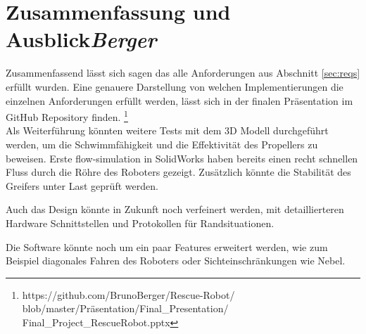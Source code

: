 \section{Zusammenfassung und Ausblick\hfill\textnormal{\emph{Berger}}}
Zusammenfassend lässt sich sagen das alle Anforderungen aus Abschnitt \ref{sec:reqs} erfüllt wurden.
Eine genauere Darstellung von welchen Implementierungen die einzelnen Anforderungen erfüllt werden,
lässt sich in der finalen Präsentation im GitHub Repository finden.
\footnote{https://github.com/BrunoBerger/Rescue-Robot/\linebreak
    blob/master/Präsentation/Final\_Presentation/\linebreak
    Final\_Project\_RescueRobot.pptx}
\\  

Als Weiterführung könnten weitere Tests mit dem 3D Modell durchgeführt werden,
um die Schwimmfähigkeit und die Effektivität des Propellers zu beweisen.
Erste flow-simulation in SolidWorks haben bereits einen recht schnellen Fluss
durch die Röhre des Roboters gezeigt.
Zusätzlich könnte die Stabilität des Greifers unter Last geprüft werden.

Auch das Design könnte in Zukunft noch verfeinert werden,
mit detaillierteren Hardware Schnittstellen 
und Protokollen für Randsituationen.

Die Software könnte noch um ein paar Features erweitert werden,
wie zum Beispiel diagonales Fahren des Roboters 
oder Sichteinschränkungen wie Nebel.

    
